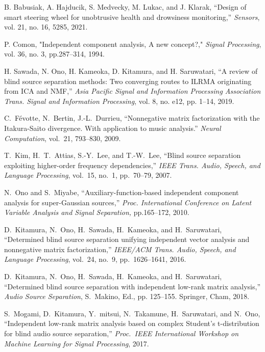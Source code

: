 \documentclass[honka]{nitkagawathesis}%
\begin{document}
\begin{thebibliography}{99}
  B. Babusiak, A. Hajducik, S. Medvecky, M. Lukac, and J. Klarak, ``Design of smart steering wheel for unobtrusive health and drowsiness monitoring,'' {\em Sensors}, 
  vol. 21, no. 16, 5285, 2021.

  P. Comon, "Independent component analysis, A new concept?," {\em Signal Processing}, vol. 36, no. 3, pp.287--314, 1994.

  H. Sawada, N. Ono, H. Kameoka, D. Kitamura, and H. Saruwatari, ``A review of
  blind source separation methods: Two converging routes to ILRMA originating from
  ICA and NMF,'' {\em Asia Pacific Signal and Information Processing Association Trans. Signal and Information Processing}, vol. 8, no. e12,
  pp. 1–14, 2019.

  C.~Févotte, N.~Bertin, J.-L.~Durrieu, 
  ``Nonnegative matrix factorization with the Itakura-Saito divergence. With application to music analysis.'' 
  {\em Neural Computation}, vol.~21, 793--830, 2009.

  T.~Kim, H.~T.~Attias, S.-Y.~Lee, and T.-W.~Lee, ``Blind source separation exploiting higher-order frequency dependencies,'' 
  {\em IEEE Trans. Audio, Speech, and Language Processing}, vol.~15, no.~1, pp.~70--79, 2007.

  N.~Ono and S.~Miyabe, ``Auxiliary-function-based independent component analysis for super-Gaussian sources,'' 
  {\em Proc. International Conference on Latent Variable Analysis and Signal Separation,} pp.165--172, 2010.

  D.~Kitamura, N.~Ono, H.~Sawada, H.~Kameoka, and H.~Saruwatari,
  ``Determined blind source separation unifying independent vector analysis and nonnegative matrix factorization,'' 
  {\em IEEE/ACM Trans. Audio, Speech, and Language Processing}, vol.~24, no.~9, pp.~1626--1641, 2016.

  D.~Kitamura, N.~Ono, H.~Sawada, H.~Kameoka, and H.~Saruwatari, ``Determined blind source separation with independent low-rank matrix analysis,'' 
  {\em Audio Source Separation}, S.~Makino, Ed., pp. 125--155. Springer, Cham, 2018.

  S.~Mogami, D.~Kitamura, Y.~mitsui, N.~Takamune, H.~Saruwatari, and N.~Ono, ``Independent low-rank matrix analysis based on complex Student's t-distribution for blind audio source     separation,''
  {\em Proc.~IEEE International Workshop on Machine Learning for Signal Processing}, 2017. 
 

\end{thebibliography}
\end{document}
